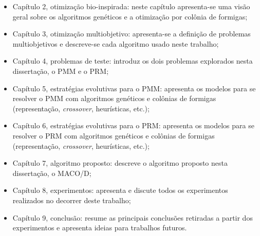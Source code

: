 \begin{itemize}  
	\item Capítulo 2, otimização bio-inspirada: neste capítulo apresenta-se uma visão geral sobre os algoritmos genéticos e a otimização por colônia de formigas;
	\item Capítulo 3, otimização multiobjetivo: apresenta-se a definição de problemas multiobjetivos e descreve-se cada algoritmo usado neste trabalho;
	\item Capítulo 4, problemas de teste: introduz os dois problemas explorados nesta dissertação, o \ac{PMM} e o \ac{PRM};
	\item Capítulo 5, estratégias evolutivas para o \ac{PMM}: apresenta os modelos para se resolver o \ac{PMM} com algoritmos genéticos e colônias de formigas (representação, \textit{crossover}, heurísticas, etc.);
	\item Capítulo 6, estratégias evolutivas para o \ac{PRM}: apresenta os modelos para se resolver o \ac{PRM} com algoritmos genéticos e colônias de formigas (representação, \textit{crossover}, heurísticas, etc.);
	\item Capítulo 7, algoritmo proposto: descreve o algoritmo proposto nesta dissertação, o \ac{MACO/D};
	\item Capítulo 8, experimentos: apresenta e discute todos os experimentos realizados no decorrer deste trabalho;
	\item Capítulo 9, conclusão: resume as principais conclusões retiradas a partir dos experimentos e apresenta ideias para trabalhos futuros.
\end{itemize}